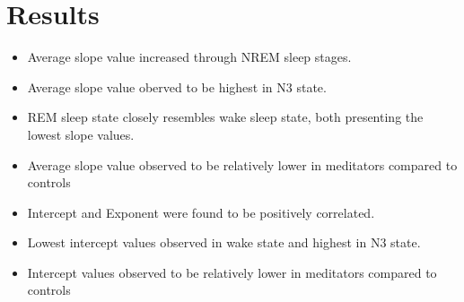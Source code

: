 \documentclass[letterpaper,10pt,english]{sphinxmanual}
\begin{document}
\begin{sphinxVerbatim}[commandchars=\\\{\}]

        

  
\end{sphinxVerbatim}


\chapter{Results}
\label{\detokenize{result:results}}\label{\detokenize{result::doc}}
\sphinxAtStartPar
{}
\begin{itemize}
\item {} 
\sphinxAtStartPar
Average slope value increased through NREM sleep stages.

\item {} 
\sphinxAtStartPar
Average slope value oberved to be highest in N3 state.

\item {} 
\sphinxAtStartPar
REM sleep state closely resembles wake sleep state, both presenting the lowest slope values.

\item {} 
\sphinxAtStartPar
Average slope value observed to be relatively lower in meditators compared to controls

\end{itemize}


\sphinxAtStartPar
{}
\begin{itemize}
\item {} 
\sphinxAtStartPar
Intercept and Exponent were found to be positively correlated.

\item {} 
\sphinxAtStartPar
Lowest intercept values observed in wake state and highest in N3 state.

\item {} 
\sphinxAtStartPar
Intercept values observed to be relatively lower in meditators compared to controls

\end{itemize}
\end{document}
